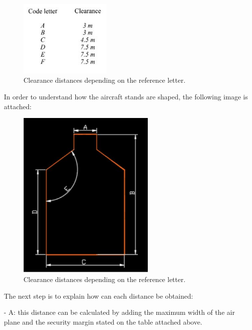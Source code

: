 		\begin{figure}[H]
			\centering
			\includegraphics[clip, trim=0cm 0cm 0cm 0cm, width=0.4\textwidth]{./images/Annex14/clearancedistances}
			\caption{Clearance distances depending on the reference letter.} %
			\label{} %
		\end{figure}
		
		In order to understand how the aircraft stands are shaped, the following image is attached:
		
		\begin{figure}[H]
			\centering
			\includegraphics[clip, trim=0cm 0cm 0cm 0cm, width=0.6\textwidth]{./images/Annex14/aircraftstand}
			\caption{Clearance distances depending on the reference letter.} %
			\label{} %
		\end{figure}
		
		The next step is to explain how can each distance be obtained:
		
		- A: this distance can be calculated by adding the maximum width of the air plane and the security margin stated on the table attached above.
		
